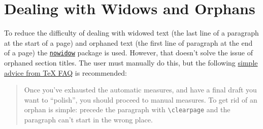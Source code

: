 \section{Dealing with Widows and Orphans}

To reduce the difficulty of dealing with widowed text (the last line of a paragraph at the start of a page) and orphaned text (the first line of paragraph at the end of a page) the \href{https://ctan.org/pkg/nowidow?lang=en}{\texttt{nowidow}} package is used.
However, that doesn't solve the issue of orphaned section titles.
The user must manually do this, but the following \href{https://texfaq.org/FAQ-widows}{simple advice from \TeX{} FAQ} is recommended:

\begin{quote}
 Once you've exhausted the automatic measures, and have a final draft you want to ``polish'', you should proceed to manual measures.
 To get rid of an orphan is simple: precede the paragraph with \texttt{\textbackslash clearpage} and the paragraph can’t start in the wrong place.
\end{quote}
